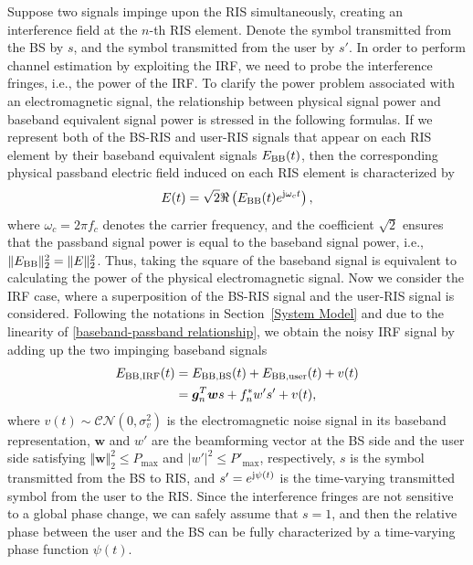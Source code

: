 \documentclass[journal,twocolumn]{IEEEtran}
\theoremstyle{nonumberplain}
\begin{document}
    Suppose two signals impinge upon the RIS simultaneously, creating an interference field at the $n$-th RIS element. Denote the symbol transmitted from the \ac{BS} by $s$, and the symbol transmitted from the user by $s'$. In order to perform channel estimation by exploiting the \ac{IRF}, we need to probe the interference fringes, i.e., the power of the \ac{IRF}. To clarify the power problem associated with an electromagnetic signal, the relationship between physical signal power and baseband equivalent signal power is stressed in the following formulas. 
    If we represent both of the BS-RIS and user-RIS signals that appear on each RIS element by their baseband equivalent signals $E_{{\rm BB}}(t)$, 
    then the corresponding physical passband electric field induced on each RIS element is characterized by 
    \begin{equation}
        E(t) = \sqrt{2} \Re\left( E_{{\rm BB}}(t)e^{{\rm j}\omega_c t} \right),
        \label{baseband-passband relationship}
    \end{equation}
    where $\omega_c = 2\pi f_c$ denotes the carrier frequency, and the coefficient $\sqrt{2}$ ensures that the passband signal power is equal to the baseband signal power, i.e., 
    $\lVert E_{{\rm BB}}\rVert_2^2 = \lVert E\rVert_2^2$. 
    Thus, taking the square of the baseband signal is equivalent to calculating the power of the physical electromagnetic signal. 
    Now we consider the IRF case, where a superposition of the BS-RIS signal and the user-RIS signal is considered. 
    Following the notations in Section~\ref{System Model} and due to the linearity of \eqref{baseband-passband relationship}, we obtain the noisy IRF signal by adding up the two impinging baseband signals
    \begin{equation}
        \begin{aligned}
            E_{{\rm BB, IRF}}(t) &= E_{{\rm BB, BS}}(t)+E_{{\rm BB,user}}(t)+v(t)\\
            &=\bm g_{n}^{T}\bm w s+f_{n}^{*} w' s' +v(t),
        \end{aligned}
    \end{equation}
    where $v(t)\sim \mathcal{CN}(0,\sigma_{v}^{2})$ is the electromagnetic noise signal in its baseband representation,
    $\bm w$ and $w'$ are the beamforming vector at the BS side and the user side satisfying $\Vert \bm w \Vert_{2}^{2}\leq P_{\text{max}}$ and $|w'|^{2}\leq P'_{\text{max}}$, respectively,
    $s$ is the symbol transmitted from the BS to RIS, and $s'=e^{{\rm j} \psi(t)}$ is the time-varying transmitted symbol from the user to the RIS.  
    Since the interference fringes are not sensitive to a global phase change, we can safely assume that $s=1$, and then the relative phase between the user and the BS can be fully characterized by a time-varying phase function $\psi(t)$.  
\end{document}
